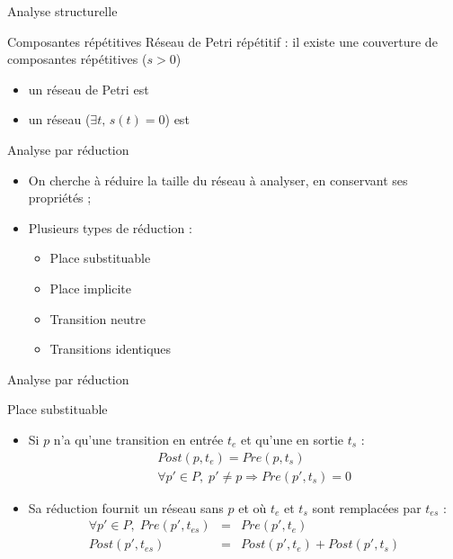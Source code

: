 \documentclass[compress]{beamer}
\begin{document}
\begin{frame}{Analyse structurelle}
\begin{block}{Composantes répétitives}
Réseau de Petri répétitif : il existe une couverture de composantes répétitives ($s>0$)
	\begin{itemize}
	\item un réseau de Petri  est 
	\item un réseau  ($\exists t, \, s(t)=0$) est 
	\end{itemize}
\end{block}
\end{frame}  

\begin{frame}{Analyse par réduction}
\begin{itemize}
\item On cherche à réduire la taille du réseau à analyser, en conservant ses propriétés ;
\item Plusieurs types de réduction :
	\begin{itemize}
	\item Place substituable
	\item Place implicite
	\item Transition neutre
	\item Transitions identiques
	\end{itemize}
\end{itemize}
\end{frame}

\begin{frame}{Analyse par réduction}
\begin{block}{Place substituable}
	\begin{itemize}
	\item Si $p$ n'a qu'une transition en entrée $t_e$ et qu'une en sortie $t_s$ :
		\begin{eqnarray*}
		& & Post(p, t_e) = Pre(p, t_s)\\
		& & \forall p' \in P, \; p' \neq p \Rightarrow Pre(p', t_s) = 0
		\end{eqnarray*}
	\item Sa réduction fournit un réseau sans $p$ et où $t_e$ et $t_s$ sont remplacées par $t_{es}$ :
		\begin{eqnarray*}
		\forall p' \in P, \; Pre(p', t_{es}) &=& Pre(p', t_e)\\
		Post(p', t_{es}) &=& Post(p', t_e) + Post(p', t_s)
		\end{eqnarray*}
	\end{itemize}	
\end{block}
\end{frame}
\end{document}
